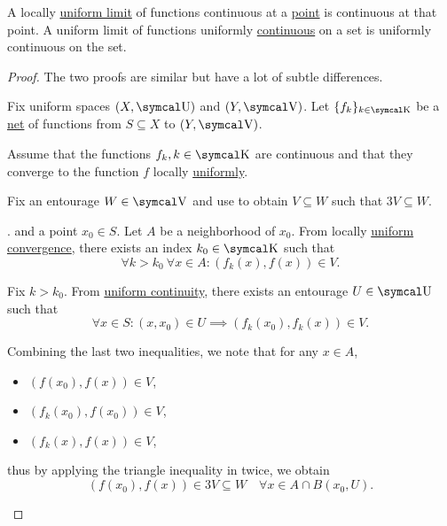 \begin{Proposition}\label{def:uniform_limit_of_continuous_functions}
  \mbox{}
  \begin{PropEnum}
     A locally \hyperref[def:function_net_convergence]{uniform limit} of functions continuous at a \hyperref[thm:uniform_space_local_continuity]{point} is continuous at that point.
     A uniform limit of functions uniformly \hyperref[def:uniform_continuity]{continuous} on a set is uniformly continuous on the set.
  \end{PropEnum}
\end{Proposition}
\begin{proof}\mbox{}
  The two proofs are similar but have a lot of subtle differences.

  Fix uniform spaces \( (X, \CU) \) and \( (Y, \CV) \). Let \( \{ f_k \}_{k \in \CK} \) be a \hyperref[def:topological_net]{net} of functions from \( S \subseteq X \) to \( (Y, \CV) \).

  \begin{RefList}
     Assume that the functions \( f_k, k \in \CK \) are continuous and that they converge to the function \( f \) locally \hyperref[def:function_net_convergence/locally_uniform]{uniformly}.

    Fix an entourage \( W \in \CV \) and use  to obtain \( V \subseteq W \) such that \( 3V \subseteq W \).

    . and a point \( x_0 \in S \). Let \( A \) be a neighborhood of \( x_0 \). From locally \hyperref[def:function_net_convergence]{uniform convergence}, there exists an index \( k_0 \in \CK \) such that
    \begin{equation*}
      \forall k > k_0 \ \forall x \in A : (f_k(x), f(x)) \in V.
    \end{equation*}

    Fix \( k > k_0 \). From \hyperref[def:function_net_convergence/locally_uniform]{uniform continuity}, there exists an entourage \( U \in \CU \) such that
    \begin{equation*}
      \forall x \in S : (x, x_0) \in U \implies (f_k(x_0), f_k(x)) \in V.
    \end{equation*}

    Combining the last two inequalities, we note that for any \( x \in A \),
    \begin{itemize}
      \item \( (f(x_0), f(x)) \in V \),
      \item \( (f_k(x_0), f(x_0)) \in V \),
      \item \( (f_k(x), f(x)) \in V \),
    \end{itemize}
    thus by applying the triangle inequality in  twice, we obtain
    \begin{equation*}
      (f(x_0), f(x)) \in 3V \subseteq W \quad\forall x \in A \cap B(x_0, U).
    \end{equation*}


\end{RefList}
\end{proof}
